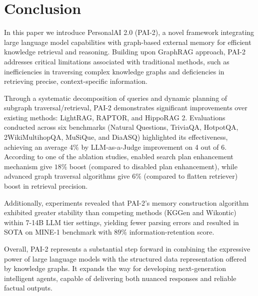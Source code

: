 \section{Conclusion}

In this paper we introduce PersonalAI 2.0 (PAI-2), a novel framework integrating large language model capabilities with graph-based external memory for efficient knowledge retrieval and reasoning. Building upon GraphRAG approach, PAI-2 addresses critical limitations associated with traditional methods, such as inefficiencies in traversing complex knowledge graphs and deficiencies in retrieving precise, context-specific information.

Through a systematic decomposition of queries and dynamic planning of subgraph traversal/retrieval, PAI-2 demonstrates significant improvements over existing methods: LightRAG, RAPTOR, and HippoRAG 2. Evaluations conducted across six benchmarks (Natural Questions, TriviaQA, HotpotQA, 2WikiMultihopQA, MuSiQue, and DiaASQ) highlighted its effectiveness, achieving an average 4\% by LLM-as-a-Judge improvement on 4 out of 6. According to one of the ablation studies, enabled search plan enhancement mechanism give $18\%$ boost (compared to disabled plan enhancement), while advanced graph traversal algorithms give $6\%$ (compared to flatten retriever) boost in retrieval precision.

Additionally, experiments revealed that PAI-2's memory construction algorithm exhibited greater stability than competing methods (KGGen and Wikontic) within 7-14B LLM tier settings, yielding fewer parsing errors and resulted in SOTA on MINE-1 benchmark with $89\%$ information-retention score.

Overall, PAI-2 represents a substantial step forward in combining the expressive power of large language models with the structured data representation offered by knowledge graphs. It expands the way for developing next-generation intelligent agents, capable of delivering both nuanced responses and reliable factual outputs. 


